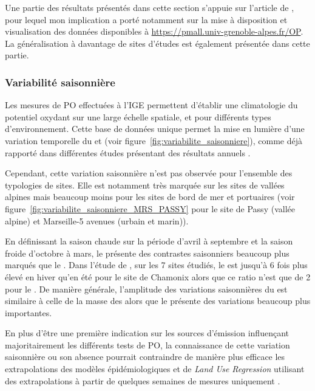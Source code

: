 \begin{tcolorbox}[colback=red!5!white,colframe=Melon,title=Note]
    Une partie des résultats présentés dans cette section s'appuie sur l'article de
    \cite{calasSeasonal2019}, pour lequel mon implication a porté notamment sur la mise à
    disposition et visualisation des données disponibles à
    \url{https://pmall.univ-grenoble-alpes.fr/OP}.\\
    La généralisation à davantage de sites d'études est également présentée dans cette
    partie.
\end{tcolorbox}

\subsubsection{Variabilité saisonnière}%
\label{ssub:variabilité_saisonnière}

Les mesures de PO effectuées à l'IGE permettent d'établir une climatologie du potentiel
oxydant sur une large échelle spatiale, et pour différents types d'environnement. Cette
base de données unique permet la mise en lumière d'une variation temporelle du \POAAv{} et
\PODTTv{} (voir figure~\ref{fig:variabilite_saisonniere}), comme déjà rapporté dans
différentes études présentant des résultats annuels
\autocite{fangOxidative2016,calasComparison2018,calasSeasonal2019,pietrograndePM102018}.

Cependant, cette variation saisonnière n'est pas observée pour l'ensemble des typologies
de sites. Elle est notamment très marquée sur les sites de vallées alpines mais beaucoup
moins pour les sites de bord de mer et portuaires (voir
figure~\ref{fig:variabilite_saisonniere_MRS_PASSY} pour le site de Passy (vallée alpine)
et Marseille-5 avenues (urbain et marin)).

En définissant la saison chaude sur la période d'avril à septembre et la saison froide
d'octobre à mars, le \POAAv{} présente des contrastes saisonniers beaucoup plus marqués que
le \PODTTv. Dans l'étude de \cite[tableau 3]{calasSeasonal2019}, sur les 7 sites étudiés,
le \POAAv{} est jusqu'à 6 fois plus élevé en hiver qu'en été pour le site de Chamonix
alors que ce ratio n'est que de 2 pour le \PODTTv. De manière générale, l'amplitude des
variations saisonnières du \PODTTv{} est similaire à celle de la masse des \PMdix{} alors
que le \POAAv{} présente des variations beaucoup plus importantes.

En plus d'être une première indication sur les sources d'émission influençant
majoritairement les différents tests de PO, la connaissance de cette variation saisonnière
ou son absence pourrait contraindre de manière plus efficace les extrapolations des
modèles épidémiologiques et de \textit{Land Use Regression} utilisant des extrapolations à
partir de quelques semaines de mesures uniquement
\autocite{yangaileenSpatial2015,jedynskaSpatial2017}.

